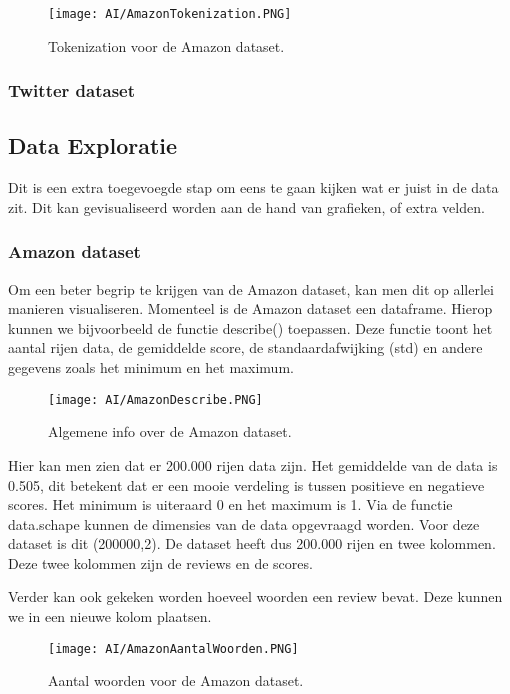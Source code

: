 \begin{figure}[!htbp]
    \texttt{[image: AI/AmazonTokenization.PNG]}
    \caption{\label{amazontokenization}Tokenization voor de Amazon dataset.}
\end{figure}
\FloatBarrier

\subsubsection{Twitter dataset} 

\subsection{Data Exploratie}
\label{proofofconceptdataexploratie}
Dit is een extra toegevoegde stap om eens te gaan kijken wat er juist in de data zit. Dit kan gevisualiseerd worden aan de hand van grafieken, of extra velden. 

\subsubsection{Amazon dataset}
Om een beter begrip te krijgen van de Amazon dataset, kan men dit op allerlei manieren visualiseren. Momenteel is de Amazon dataset een dataframe. Hierop kunnen we bijvoorbeeld de functie describe() toepassen. Deze functie toont het aantal rijen data, de gemiddelde score, de standaardafwijking (std) en andere gegevens zoals het minimum en het maximum. 

\begin{figure}[!htbp]
    \texttt{[image: AI/AmazonDescribe.PNG]}
    \caption{\label{amazondescribe}Algemene info over de Amazon dataset.}
\end{figure}
\FloatBarrier 

Hier kan men zien dat er 200.000 rijen data zijn. Het gemiddelde van de data is 0.505, dit betekent dat er een mooie verdeling is tussen positieve en negatieve scores. Het minimum is uiteraard 0 en het maximum is 1. Via de functie data.schape kunnen de dimensies van de data opgevraagd worden. Voor deze dataset is dit (200000,2). De dataset heeft dus 200.000 rijen en twee kolommen. Deze twee kolommen zijn de reviews en de scores. 

Verder kan ook gekeken worden hoeveel woorden een review bevat. Deze kunnen we in een nieuwe kolom plaatsen. 

\begin{figure}[!htbp]
    \texttt{[image: AI/AmazonAantalWoorden.PNG]}
    \caption{\label{amazonaantalwoorden}Aantal woorden voor de Amazon dataset.}
\end{figure}
\FloatBarrier

